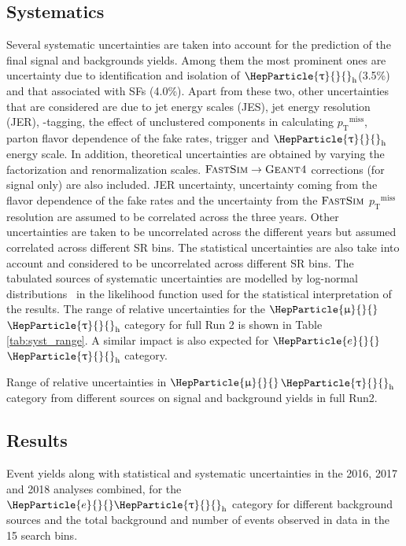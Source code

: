 \documentclass[12pt, a4paper]{article}
\newcommand{\pt}{\ensuremath{p_{\mathrm{T}}}\xspace}
\newcommand{\ptmiss}{\ensuremath{\pt^\text{miss}}}
\DeclareRobustCommand{\PQb}{{\HepParticle{b}{}{}}\xspace} %
\DeclareRobustCommand{\PQt}{\HepParticle{t}{}{}} %
\DeclareRobustCommand{\PAQt}{{\HepAntiParticle{\PQt}{}{}}\xspace} %
\DeclareRobustCommand{\Pe}{{\HepParticle{e}{}{}}\xspace} %
\DeclareRobustCommand{\PGm}{{\HepParticle{\upmu}{}{}}\xspace} %
\DeclareRobustCommand{\PGt}{{\HepParticle{\uptau}{}{}}\xspace} %
\newcommand{\ttbar}{\PQt{}\PAQt} %
\newcommand{\tauh}{\ensuremath{\PGt_\mathrm{h}}\xspace}
\begin{document}
\subsection{Systematics}
Several systematic uncertainties are taken into account for the prediction of the final signal and backgrounds yields. Among them the most prominent ones are uncertainty due to identification and isolation of \tauh (3.5\%) and that associated with \ttbar SFs (4.0\%). Apart from these two, other uncertainties that are considered are due to jet energy scales (JES), jet energy resolution (JER), \PQb-tagging, the effect of unclustered components in calculating \ptmiss, parton flavor dependence of the fake rates, trigger and \tauh energy scale. In addition, theoretical uncertainties are obtained by varying the factorization and renormalization scales.
$\textsc{FastSim}\to\textsc{Geant4}$ corrections (for signal only) are also included. JER uncertainty, uncertainty coming from the flavor dependence of the fake rates and the uncertainty from the $\textsc{FastSim}$ \ptmiss resolution are assumed to be correlated across the three years. Other uncertainties are taken to be uncorrelated across the different years but assumed correlated across different SR bins. The statistical uncertainties are also take into account and considered to be uncorrelated across different SR bins. The tabulated sources of systematic uncertainties are modelled by log-normal distributions~\cite{CMS-NOTE-2011-005} in the likelihood function used for the statistical interpretation of the results. The range of relative uncertainties for the $\PGm$$\tauh$ category for full Run 2 is shown in Table \ref{tab:syst_range}. A similar impact is also expected for $\Pe$$\tauh$ category.
\begin{table}[htb!]
	\centering
	\small\addtolength{\tabcolsep}{-0.0pt}
	\caption{Range of relative uncertainties in $\PGm$$\tauh$ category from different sources on signal and background yields in full Run2.}
	
	\label{tab:syst_range}
\end{table}

\subsection{Results}
\begin{table}
\centering
\caption{Event yields along with statistical and systematic uncertainties in the 2016, 2017 and 2018 analyses combined, for the $\Pe\tauh$ category for different background sources and the total background and number of events observed in data in the 15 search bins.}
	\small\addtolength{\tabcolsep}{-4pt}
	
	\label{tab:EleTau_fullRun2}
\end{table}
\end{document}
